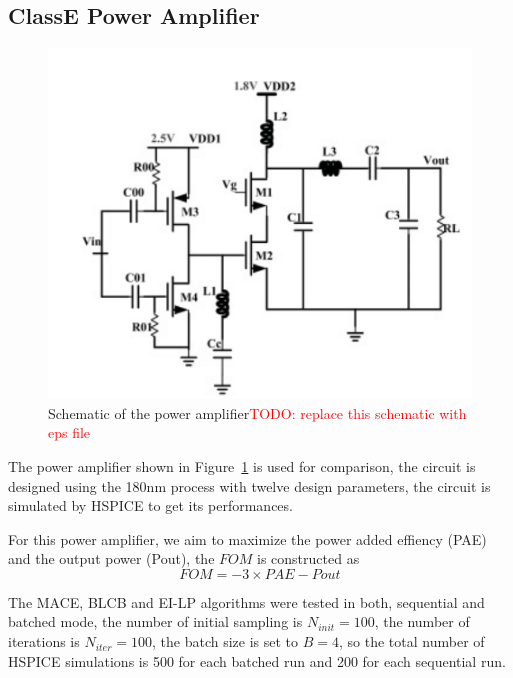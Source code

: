 \subsection{ClassE Power Amplifier}


\begin{figure}[htbp]
    \begin{center}
        \centerline{\includegraphics[width=\columnwidth]{./img/classE.png}}
        \caption{Schematic of the power amplifier\textcolor{red}{TODO: replace this schematic with eps file} }
        \label{fig:schPA}
    \end{center}
\end{figure}

The power amplifier shown in Figure~\ref{fig:schPA} is used for comparison, the
circuit is designed using the 180nm process with twelve design parameters, the
circuit is simulated by HSPICE to get its performances.

For this power amplifier, we aim to maximize the power added effiency (PAE) and the output power (Pout), the $FOM$ is constructed as
$$
\mathit{FOM} = -3 \times \mathit{PAE} - \mathit{Pout}
$$

The MACE, BLCB and EI-LP algorithms were tested in both, sequential and batched
mode, the number of initial sampling is $N_{init} = 100$, the number of
iterations is $N_{iter} = 100$, the batch size is set to $B = 4$, so the total
number of HSPICE simulations is 500 for each batched run and 200 for each
sequential run.


